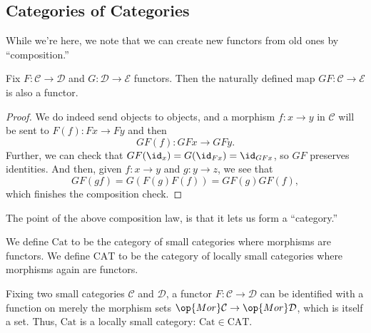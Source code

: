 \subsection{Categories of Categories}
While we're here, we note that we can create new functors from old ones by ``composition.''
\begin{proposition}
	Fix $F:\mathcal C\to\mathcal D$ and $G:\mathcal D\to\mathcal E$ functors. Then the naturally defined map $GF:\mathcal C\to\mathcal E$ is also a functor.
\end{proposition}
\begin{proof}
	We do indeed send objects to objects, and a morphism $f:x\to y$ in $\mathcal C$ will be sent to $F(f):Fx\to Fy$ and then
	\[GF(f):GFx\to GFy.\]
	Further, we can check that $GF(\id_x)=G(\id_{Fx})=\id_{GFx}$, so $GF$ preserves identities. And then, given $f:x\to y$ and $g:y\to z$, we see that
	\[GF(gf)=G(F(g)F(f))=GF(g)GF(f),\]
	which finishes the composition check.
\end{proof}
The point of the above composition law, is that it lets us form a ``category.''
\begin{definition}
	We define $\mathrm{Cat}$ to be the category of small categories where morphisms are functors. We define $\mathrm{CAT}$ to be the category of locally small categories where morphisms again are functors.
\end{definition}
\begin{remark}
	Fixing two small categories $\mathcal C$ and $\mathcal D$, a functor $F:\mathcal C\to\mathcal D$ can be identified with a function on merely the morphism sets $\op{Mor}\mathcal C\to\op{Mor}\mathcal D$, which is itself a set. Thus, $\mathrm{Cat}$ is a locally small category: $\mathrm{Cat}\in\mathrm{CAT}$.
\end{remark}

